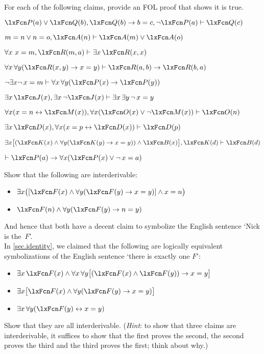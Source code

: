 \practiceproblems
\problempart
\label{pr.identity}
For each of the following claims, provide an FOL proof that shows it
is true.
\begin{compactlist}
\item $\atom{P}{a} \eor \atom{Q}{b}, \atom{Q}{b} \eif b=c, \enot\atom{P}{a} \proves \atom{Q}{c}$
\item $m=n \eor n=o, \atom{A}{n} \proves \atom{A}{m} \eor \atom{A}{o}$
\item $\forall x\ x=m, \atom{R}{m,a} \proves \exists x\,\atom{R}{x,x}$
\item $\forall x\,\forall y(\atom{R}{x,y} \eif x=y)\proves \atom{R}{a,b} \eif \atom{R}{b,a}$
\item $\enot \exists x\enot\, {x = m} \proves \forall x\,\forall y (\atom{P}{x} \eif \atom{P}{y})$
\item $\exists x\,\atom{J}{x}, \exists x\, \enot\atom{J}{x}\proves \exists x\, \exists y\, \enot\, {x = y}$
\item $\forall x(x=n \eiff \atom{M}{x}), \forall x(\atom{O}{x} \eor \enot \atom{M}{x})\proves \atom{O}{n}$
\item $\exists x\,\atom{D}{x}, \forall x(x=p \eiff \atom{D}{x})\proves \atom{D}{p}$
\item $\exists x\bigl[(\atom{K}{x} \eand \forall y(\atom{K}{y} \eif x=y)) \eand \atom{B}{x}\bigr], \atom{K}{d} \proves \atom{B}{d}$
\item $\proves \atom{P}{a} \eif \forall x(\atom{P}{x} \eor \enot\, {x = a})$
\end{compactlist}

\problempart
Show that the following are interderivable:
\begin{itemize}
\item $\exists x \bigl([\atom{F}{x} \eand \forall y (\atom{F}{y} \eif x = y)] \eand x = n\bigr)$
\item $\atom{F}{n} \eand \forall y (\atom{F}{y} \eif n= y)$
\end{itemize}
And hence that both have a decent claim to symbolize the English sentence `Nick is the~$F$'.\\

\problempart
In \cref{sec.identity}, we claimed that the following are logically equivalent symbolizations of the English sentence `there is exactly one $F$':
\begin{itemize}
\item $\exists x\,\atom{F}{x} \eand \forall x\, \forall y \bigl[(\atom{F}{x} \eand \atom{F}{y}) \eif x = y\bigr]$
\item $\exists x \bigl[\atom{F}{x} \eand \forall y (\atom{F}{y} \eif x = y)\bigr]$
\item $\exists x\, \forall y (\atom{F}{y} \eiff x = y)$
\end{itemize}
Show that they are all interderivable. (\emph{Hint}: to show that three claims are interderivable, it suffices to show that the first proves the second, the second proves the third and the third proves the first; think about why.)



